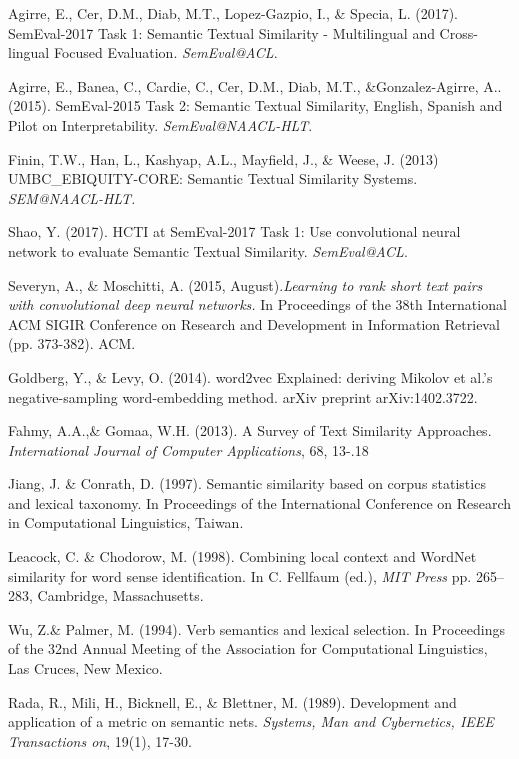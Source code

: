 \documentclass{article} %
\begin{document}
\begin{thebibliography}{9}
	 Agirre, E., Cer, D.M., Diab, M.T., Lopez-Gazpio, I., \& Specia, L. (2017). SemEval-2017 Task 1: Semantic Textual Similarity - Multilingual and Cross-lingual Focused Evaluation. {\it SemEval@ACL}.
	
	Agirre, E., Banea, C., Cardie, C., Cer, D.M., Diab, M.T., \&Gonzalez-Agirre, A.. (2015). SemEval-2015 Task 2: Semantic Textual Similarity, English, Spanish and Pilot on Interpretability.  {\it SemEval@NAACL-HLT}. 
        
     Finin, T.W., Han, L., Kashyap, A.L., Mayfield, J., \& Weese, J. (2013) UMBC\_EBIQUITY-CORE: Semantic Textual Similarity Systems. {\it SEM@NAACL-HLT.}

	 Shao, Y. (2017). HCTI at SemEval-2017 Task 1: Use convolutional neural network to evaluate Semantic Textual Similarity. {\it SemEval@ACL}.
    
	Severyn, A., \& Moschitti, A. (2015, August).\textit {Learning to rank short text pairs with convolutional deep neural networks.} In Proceedings of the 38th International ACM SIGIR Conference on Research and Development in Information Retrieval (pp. 373-382). ACM.
	
	 Goldberg, Y., \& Levy, O. (2014). word2vec Explained: deriving Mikolov et al.'s negative-sampling word-embedding method. arXiv preprint arXiv:1402.3722.
    
    Fahmy, A.A.,\& Gomaa, W.H. (2013). A Survey of Text Similarity Approaches. {\it International Journal of Computer Applications}, 68, 13-.18
   
     Jiang, J. \& Conrath, D. (1997). Semantic similarity based on corpus statistics and lexical taxonomy. In Proceedings of the International Conference on Research in Computational Linguistics, Taiwan.
    
     Leacock, C. \& Chodorow, M. (1998). Combining local context and WordNet similarity for word sense identification. In C. Fellfaum (ed.), {\it MIT Press} pp. 265--283, Cambridge, Massachusetts. 
    
      Wu, Z.\& Palmer, M. (1994). Verb semantics and lexical selection. In Proceedings of the 32nd Annual Meeting of the Association for Computational Linguistics, Las Cruces, New Mexico.
        
     Rada, R., Mili, H., Bicknell, E., \& Blettner, M. (1989). Development and application of a metric on semantic nets. {\it Systems, Man and Cybernetics, IEEE Transactions on}, 19(1), 17-30.
    


\end{thebibliography}
\end{document}
